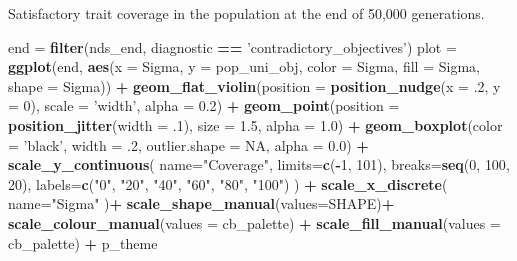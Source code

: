 \documentclass[]{book}
\newenvironment{Shaded}{\begin{snugshade}}{\end{snugshade}}
\newcommand{\DataTypeTok}[1]{\textcolor[rgb]{0.13,0.29,0.53}{#1}}
\newcommand{\DecValTok}[1]{\textcolor[rgb]{0.00,0.00,0.81}{#1}}
\newcommand{\FloatTok}[1]{\textcolor[rgb]{0.00,0.00,0.81}{#1}}
\newcommand{\KeywordTok}[1]{\textcolor[rgb]{0.13,0.29,0.53}{\textbf{#1}}}
\newcommand{\NormalTok}[1]{#1}
\newcommand{\OperatorTok}[1]{\textcolor[rgb]{0.81,0.36,0.00}{\textbf{#1}}}
\newcommand{\OtherTok}[1]{\textcolor[rgb]{0.56,0.35,0.01}{#1}}
\newcommand{\StringTok}[1]{\textcolor[rgb]{0.31,0.60,0.02}{#1}}
\begin{document}
Satisfactory trait coverage in the population at the end of 50,000 generations.

\begin{Shaded}
\begin{Highlighting}[]
\NormalTok{end =}\StringTok{ }\KeywordTok{filter}\NormalTok{(nds_end, diagnostic }\OperatorTok{==}\StringTok{ 'contradictory_objectives'}\NormalTok{)}
\NormalTok{plot =}\StringTok{ }\KeywordTok{ggplot}\NormalTok{(end, }\KeywordTok{aes}\NormalTok{(}\DataTypeTok{x =}\NormalTok{ Sigma, }\DataTypeTok{y =}\NormalTok{ pop_uni_obj, }\DataTypeTok{color =}\NormalTok{ Sigma, }\DataTypeTok{fill =}\NormalTok{ Sigma, }\DataTypeTok{shape =}\NormalTok{ Sigma)) }\OperatorTok{+}
\StringTok{  }\KeywordTok{geom_flat_violin}\NormalTok{(}\DataTypeTok{position =} \KeywordTok{position_nudge}\NormalTok{(}\DataTypeTok{x =} \FloatTok{.2}\NormalTok{, }\DataTypeTok{y =} \DecValTok{0}\NormalTok{), }\DataTypeTok{scale =} \StringTok{'width'}\NormalTok{, }\DataTypeTok{alpha =} \FloatTok{0.2}\NormalTok{) }\OperatorTok{+}
\StringTok{  }\KeywordTok{geom_point}\NormalTok{(}\DataTypeTok{position =} \KeywordTok{position_jitter}\NormalTok{(}\DataTypeTok{width =} \FloatTok{.1}\NormalTok{), }\DataTypeTok{size =} \FloatTok{1.5}\NormalTok{, }\DataTypeTok{alpha =} \FloatTok{1.0}\NormalTok{) }\OperatorTok{+}
\StringTok{  }\KeywordTok{geom_boxplot}\NormalTok{(}\DataTypeTok{color =} \StringTok{'black'}\NormalTok{, }\DataTypeTok{width =} \FloatTok{.2}\NormalTok{, }\DataTypeTok{outlier.shape =} \OtherTok{NA}\NormalTok{, }\DataTypeTok{alpha =} \FloatTok{0.0}\NormalTok{) }\OperatorTok{+}
\StringTok{  }\KeywordTok{scale_y_continuous}\NormalTok{(}
    \DataTypeTok{name=}\StringTok{"Coverage"}\NormalTok{,}
    \DataTypeTok{limits=}\KeywordTok{c}\NormalTok{(}\OperatorTok{-}\DecValTok{1}\NormalTok{, }\DecValTok{101}\NormalTok{),}
    \DataTypeTok{breaks=}\KeywordTok{seq}\NormalTok{(}\DecValTok{0}\NormalTok{, }\DecValTok{100}\NormalTok{, }\DecValTok{20}\NormalTok{),}
    \DataTypeTok{labels=}\KeywordTok{c}\NormalTok{(}\StringTok{"0"}\NormalTok{, }\StringTok{"20"}\NormalTok{, }\StringTok{"40"}\NormalTok{, }\StringTok{"60"}\NormalTok{, }\StringTok{"80"}\NormalTok{, }\StringTok{"100"}\NormalTok{)}
\NormalTok{  ) }\OperatorTok{+}
\StringTok{  }\KeywordTok{scale_x_discrete}\NormalTok{(}
    \DataTypeTok{name=}\StringTok{"Sigma"}
\NormalTok{  )}\OperatorTok{+}
\StringTok{  }\KeywordTok{scale_shape_manual}\NormalTok{(}\DataTypeTok{values=}\NormalTok{SHAPE)}\OperatorTok{+}
\StringTok{  }\KeywordTok{scale_colour_manual}\NormalTok{(}\DataTypeTok{values =}\NormalTok{ cb_palette) }\OperatorTok{+}
\StringTok{  }\KeywordTok{scale_fill_manual}\NormalTok{(}\DataTypeTok{values =}\NormalTok{ cb_palette) }\OperatorTok{+}
\StringTok{  }\NormalTok{p_theme}


\end{Highlighting}
\end{Shaded}
\end{document}
